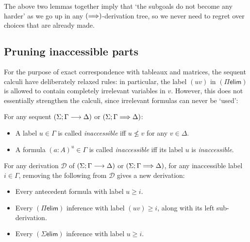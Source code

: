 \documentclass[twoside]{report}
\begin{document}
The above two lemmas together imply that `the subgoals do not become any harder' as we go up in any $(\Longrightarrow)$-derivation tree, so we never need to regret over choices that are already made.

\subsection*{Pruning inaccessible parts}

For the purpose of exact correspondence with tableaux and matrices, the sequent calculi have deliberately relaxed rules: in particular, the label $(uv)$ in $(\Pi\mathsf{elim})$ is allowed to contain completely irrelevant variables in $v$. However, this does not essentially strengthen the calculi, since irrelevant formulas can never be `used':

\begin{definition}
\label{def:inaccessible_formulas}
For any sequent $(\Sigma; \Gamma \longrightarrow \Delta)$ or $(\Sigma; \Gamma \Longrightarrow \Delta)$:
\begin{itemize}[noitemsep]
    \item A label $u \in \Gamma$ is called \emph{inaccessible} iff $u \not\leq v$ for any $v \in \Delta$.
    \item A formula $(a : A)^u \in \Gamma$ is called \emph{inaccessible} iff its label $u$ is \emph{inaccessible}.
\end{itemize}
\end{definition}

\begin{proposition}
\label{thm:sequent_calculi_pruning_step}
For any derivation $\mathcal D$ of $(\Sigma; \Gamma \longrightarrow \Delta)$ or $(\Sigma; \Gamma \Longrightarrow \Delta)$, for any inaccessible label $i \in \Gamma$, removing the following from $\mathcal D$ gives a new derivation:
\begin{itemize}[noitemsep]
    \item Every antecedent formula with label $u \geq i$.
    \item Every $(\Pi\mathsf{elim})$ inference with label $(uv) \geq i$, along with its left sub-derivation.
    \item Every $(\Sigma\mathsf{elim})$ inference with label $u \geq i$.
\end{itemize}
\end{proposition}
\end{document}
